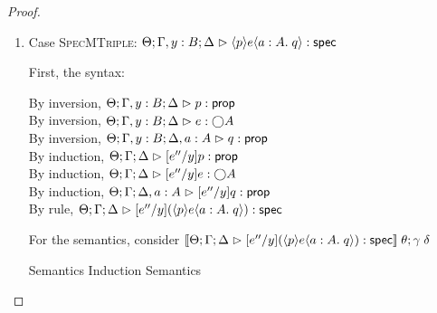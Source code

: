 \begin{proof}
\begin{enumerate}
\item Case \textsc{SpecMTriple}: $\judgeS[\Theta; \Gamma, y:B; \Delta]{\mspec{p}{e}{a:A}{q}}$
  
  First, the syntax:
  \begin{tabbedproof}
    \oo By inversion, $\judgeA[\Theta; \Gamma, y:B; \Delta]{p}{\assert}$ \\
    \oo By inversion, $\judgeA[\Theta; \Gamma, y:B; \Delta]{e}{\monad{A}}$ \\
    \oo By inversion, $\judgeA[\Theta; \Gamma, y:B; \Delta, a:A]{q}{\assert}$ \\
    \oo By induction, $\judgeA[\Theta; \Gamma; \Delta]{[e''/y]p}{\assert}$ \\
    \oo By induction, $\judgeA[\Theta; \Gamma; \Delta]{[e''/y]e}{\monad{A}}$ \\
    \oo By induction, $\judgeA[\Theta; \Gamma; \Delta, a:A]{[e''/y]q}{\assert}$ \\
    \oo By rule, $\judgeS[\Theta; \Gamma; \Delta]{[e''/y](\mspec{p}{e}{a:A}{q})}$
  \end{tabbedproof}

  For the semantics, consider $\interp{\judgeS[\Theta; \Gamma; \Delta]{[e''/y](\mspec{p}{e}{a:A}{q})}}\;\theta;\gamma\;\delta$
  \begin{eqnproof}
          {Semantics}
          {Induction}
          {Semantics}
  \end{eqnproof}


\end{enumerate}
\end{proof}
